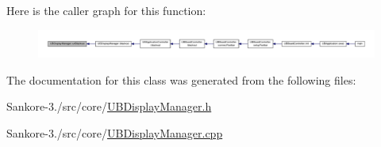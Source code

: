 Here is the caller graph for this function\-:
\nopagebreak
\begin{figure}[H]
\begin{center}
\leavevmode
\includegraphics[width=350pt]{dd/d0f/class_u_b_display_manager_a0d39dbe11146c6e9ebbe03f14bbebd2e_icgraph}
\end{center}
\end{figure}




The documentation for this class was generated from the following files\-:\begin{DoxyCompactItemize}
\item 
Sankore-\/3./src/core/\hyperlink{_u_b_display_manager_8h}{U\-B\-Display\-Manager.\-h}\item 
Sankore-\/3./src/core/\hyperlink{_u_b_display_manager_8cpp}{U\-B\-Display\-Manager.\-cpp}\end{DoxyCompactItemize}
